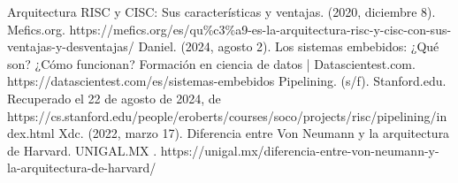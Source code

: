 \documentclass[12pt]{report}
\begin{document}
\newpage
\begin{thebibliography}{1}
 Arquitectura RISC y CISC: Sus características y ventajas. (2020, diciembre 8). Mefics.org. https://mefics.org/es/qu\%c3\%a9-es-la-arquitectura-risc-y-cisc-con-sus-ventajas-y-desventajas/
 Daniel. (2024, agosto 2). Los sistemas embebidos: ¿Qué son? ¿Cómo funcionan? Formación en ciencia de datos | Datascientest.com. https://datascientest.com/es/sistemas-embebidos
 Pipelining. (s/f). Stanford.edu. Recuperado el 22 de agosto de 2024, de https://cs.stanford.edu/people/eroberts/courses/soco/projects/risc/pipelining/index.html
 Xdc. (2022, marzo 17). Diferencia entre Von Neumann y la arquitectura de Harvard. UNIGAL.MX . https://unigal.mx/diferencia-entre-von-neumann-y-la-arquitectura-de-harvard/




\end{thebibliography}
\end{document}
